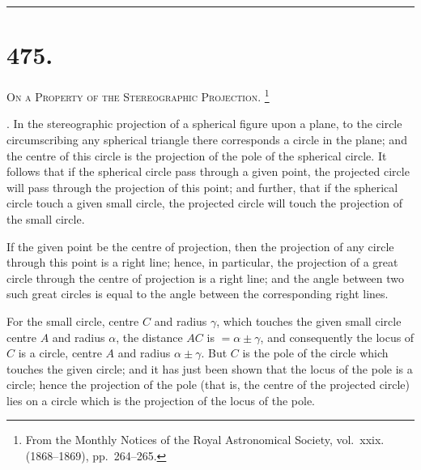 \documentclass[11pt,a4paper]{article}
\theoremstyle{definition}
\begin{document}
\hfill\rule{1.5cm}{0.4pt}

\newpage

\section*{475.}
\markboth{ON A PROPERTY OF THE STEREOGRAPHIC PROJECTION.}{475]}

\noindent\textsc{On a Property of the Stereographic Projection.}%
\footnote{From the Monthly Notices of the Royal Astronomical Society, vol.~xxix. (1868--1869), pp.~264--265.}

\smallskip

. In the stereographic projection of a spherical figure upon a plane, to the circle
circumscribing any spherical triangle there corresponds a circle in the plane; and the
centre of this circle is the projection of the pole of the spherical circle. It follows that
if the spherical circle pass through a given point, the projected circle will pass through
the projection of this point; and further, that if the spherical circle touch a given small
circle, the projected circle will touch the projection of the small circle.

If the given point be the centre of projection, then the projection of any circle
through this point is a right line; hence, in particular, the projection of a great circle
through the centre of projection is a right line; and the angle between two such great
circles is equal to the angle between the corresponding right lines.

For the small circle, centre $C$ and radius $\gamma$, which touches the given small circle
centre $A$ and radius $\alpha$, the distance $AC$ is $=\alpha\pm\gamma$, and consequently the locus of $C$
is a circle, centre $A$ and radius $\alpha\pm\gamma$. But $C$ is the pole of the circle which touches the
given circle; and it has just been shown that the locus of the pole is a circle; hence the
projection of the pole (that is, the centre of the projected circle) lies on a circle which
is the projection of the locus of the pole.
\end{document}
